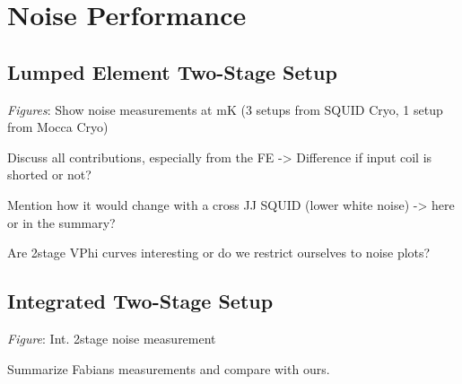 
\section{Noise Performance}

\subsection{Lumped Element Two-Stage Setup}

\textit{Figures}: Show noise measurements at mK (3 setups from SQUID Cryo, 1 setup from Mocca Cryo) 

Discuss all contributions, especially from the FE -> Difference if input coil is shorted or not?

Mention how it would change with a cross JJ SQUID (lower white noise) -> here or in the summary?

Are 2stage VPhi curves interesting or do we restrict ourselves to noise plots?

\subsection{Integrated Two-Stage Setup}

\textit{Figure}: Int. 2stage noise measurement

Summarize Fabians measurements and compare with ours. 